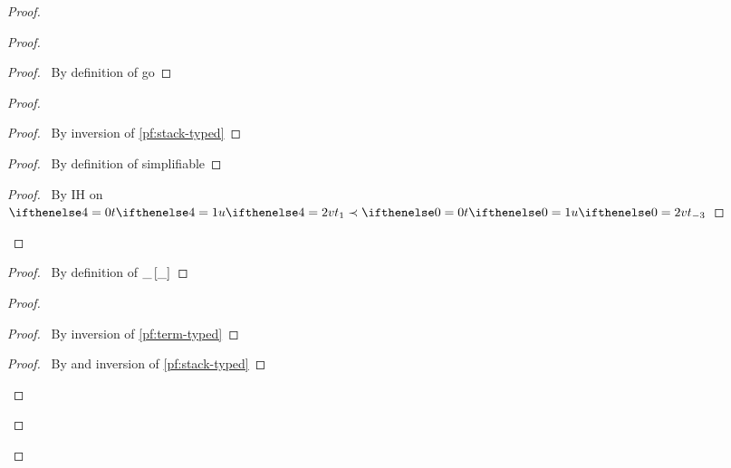 \documentclass[a4paper]{article}
\begin{document}
\begin{proof}
\begin{proof}
\begin{proof}
      \pf\ By definition of \textsf{go}
    \end{proof}
     \begin{proof}
      \begin{proof}
        \pf\ By inversion of \ref{pf:stack-typed}
      \end{proof}
      \begin{proof}
        \pf\ By definition of simplifiable
      \end{proof}
      \qedstep
      \begin{proof}
        \pf\ By IH on $\aTerm[4] \prec  \aTerm$
      \end{proof}
    \end{proof}
    \begin{proof}
      \pf\ By definition of $\_ \left[ \_ \right]$
    \end{proof}
    \begin{proof}
      \begin{proof}
        \pf\ By inversion of \ref{pf:term-typed}
      \end{proof}
      \begin{proof}
        \pf\ By  and inversion of \ref{pf:stack-typed}
      \end{proof}

\end{proof}
\end{proof}
\end{proof}
\end{document}
